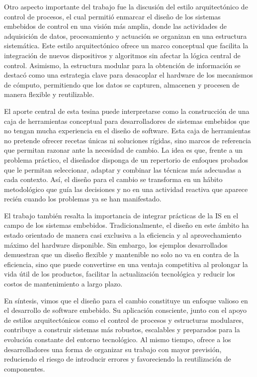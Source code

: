 Otro aspecto importante del trabajo fue la discusión del estilo arquitectónico de control de procesos, el cual permitió enmarcar el diseño de los sistemas embebidos de control en una visión más amplia, donde las actividades de adquisición de datos, procesamiento y actuación se organizan en una estructura sistemática. Este estilo arquitectónico ofrece un marco conceptual que facilita la integración de nuevos dispositivos y algoritmos sin afectar la lógica central de control. Asimismo, la estructura modular para la obtención de información se destacó como una estrategia clave para desacoplar el hardware de los mecanismos de cómputo, permitiendo que los datos se capturen, almacenen y procesen de manera flexible y reutilizable.

El aporte central de esta tesina puede interpretarse como la construcción de una caja de herramientas conceptual para desarrolladores de sistemas embebidos que no tengan mucha experiencia en el diseño de software. Esta caja de herramientas no pretende ofrecer recetas únicas ni soluciones rígidas, sino marcos de referencia que permitan razonar ante la necesidad de cambio. La idea es que, frente a un problema práctico, el diseñador disponga de un repertorio de enfoques probados que le permitan seleccionar, adaptar y combinar las técnicas más adecuadas a cada contexto. Así, el diseño para el cambio se transforma en un hábito metodológico que guía las decisiones y no en una actividad reactiva que aparece recién cuando los problemas ya se han manifestado.

El trabajo también resalta la importancia de integrar prácticas de la \gls{IS} en el campo de los sistemas embebidos. Tradicionalmente, el diseño en este ámbito ha estado orientado de manera casi exclusiva a la eficiencia y al aprovechamiento máximo del hardware disponible. Sin embargo, los ejemplos desarrollados demuestran que un diseño flexible y mantenible no solo no va en contra de la eficiencia, sino que puede convertirse en una ventaja competitiva al prolongar la vida útil de los productos, facilitar la actualización tecnológica y reducir los costos de mantenimiento a largo plazo.

En síntesis, vimos que el diseño para el cambio constituye un enfoque valioso en el desarrollo de software embebido. Su aplicación consciente, junto con el apoyo de estilos arquitectónicos como el control de procesos y estructuras modulares, contribuye a construir sistemas más robustos, escalables y preparados para la evolución constante del entorno tecnológico. Al mismo tiempo, ofrece a los desarrolladores una forma de organizar su trabajo con mayor previsión, reduciendo el riesgo de introducir errores y favoreciendo la reutilización de componentes.

